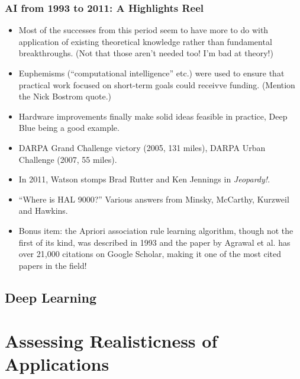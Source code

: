 \documentclass{beamer}
\begin{document}
  \begin{frame}
    \frametitle{AI from 1993 to 2011: A Highlights Reel}

    \begin{itemize}
      \item Most of the successes from this period seem to have more to do
        with application of existing theoretical knowledge rather than
        fundamental breakthroughs. (Not that those aren't needed too! I'm bad
        at theory!)
      \pause
      \item Euphemisms (``computational intelligence'' etc.) were used to
        ensure that practical work focused on short-term goals could receivve
        funding. (Mention the Nick Bostrom quote.)
      \pause
      \item Hardware improvements finally make solid ideas feasible in
        practice, Deep Blue being a good example.
      \pause
      \item DARPA Grand Challenge victory (2005, 131 miles), DARPA Urban
        Challenge (2007, 55 miles).
      \pause
      \item In 2011, Watson stomps Brad Rutter and Ken Jennings in
        \textit{Jeopardy!}.
      \pause
      \item ``Where is HAL 9000?'' Various answers from Minsky, McCarthy,
        Kurzweil and Hawkins.
      \pause
      \item Bonus item: the Apriori association rule learning algorithm,
        though not the first of its kind, was described in 1993 and the paper
        by Agrawal et al. has over 21,000 citations on Google Scholar, making
        it one of the most cited papers in the field!
    \end{itemize}
  \end{frame}


  \subsection{Deep Learning}

  \section{Assessing Realisticness of Applications}

\end{document}
